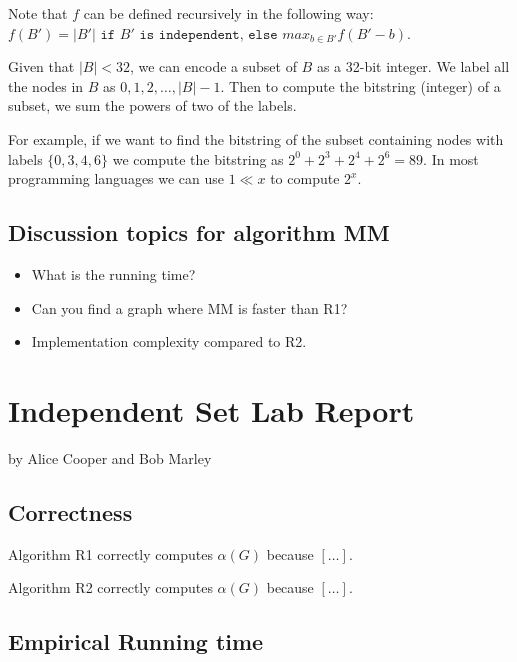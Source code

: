 \documentclass{tufte-handout}
\begin{document}
\bigskip

Note that $f$ can be defined recursively in the following way: 
$f(B') = |B'| \texttt{ if }B' \texttt{ is independent, else } max_{b \in B'}f(B' - b)$.

\bigskip

Given that $|B| < 32$, we can encode a subset of $B$ as a 32-bit integer.
We label all the nodes in $B$ as $0, 1, 2, \ldots, |B| - 1$. Then to compute the bitstring (integer) of a subset,
we sum the powers of two of the labels.

For example, if we want to find the bitstring of the subset containing nodes with labels $\{ 0, 3, 4, 6 \} $ we compute the bitstring as $2^0 + 2^3 + 2^4 + 2^6 = 89$.
In most programming languages we can use $1\ll x$ to compute $2^x$.

\subsection{Discussion topics for algorithm MM}
\begin{itemize}
    \item What is the running time?
    \item Can you find a graph where MM is faster than R1?
    \item Implementation complexity compared to R2.
\end{itemize}

\newpage


\newpage
\section{Independent Set Lab Report}


by Alice Cooper and Bob Marley

\subsection{Correctness}
Algorithm R1 correctly computes $\alpha(G)$ because $[\ldots]$.

\noindent
Algorithm R2 correctly computes $\alpha(G)$ because $[\ldots]$.

\subsection{Empirical Running time}
\end{document}
